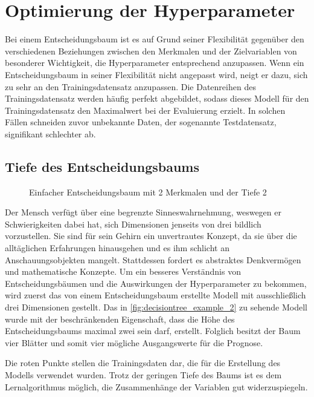 \documentclass[12pt, a4paper]{article}
\begin{document}
\newpage

\section{Optimierung der Hyperparameter}
\label{sec:hyperparameters}

Bei einem Entscheidungsbaum ist es auf Grund seiner Flexibilität gegenüber den verschiedenen Beziehungen zwischen den Merkmalen und der Zielvariablen von besonderer Wichtigkeit, die Hyperparameter entsprechend anzupassen. Wenn ein Entscheidungsbaum in seiner Flexibilität nicht angepasst wird, neigt er dazu, sich zu sehr an den Trainingsdatensatz anzupassen. Die Datenreihen des Trainingsdatensatz werden häufig perfekt abgebildet, sodass dieses Modell für den Trainingsdatensatz den Maximalwert bei der Evaluierung erzielt. In solchen Fällen schneiden zuvor unbekannte Daten, der sogenannte Testdatensatz, signifikant schlechter ab.

\subsection{Tiefe des Entscheidungsbaums}

\begin{figure}[H]
\centering
\def\svgwidth{350pt}

\caption{Einfacher Entscheidungsbaum mit 2 Merkmalen und der Tiefe 2}
\label{fig:decisiontree_example_2}
\end {figure}

Der Mensch verfügt über eine begrenzte Sinneswahrnehmung, weswegen er Schwierigkeiten dabei hat, sich Dimensionen jenseits von drei bildlich vorzustellen. Sie sind für sein Gehirn ein unvertrautes Konzept, da sie über die alltäglichen Erfahrungen hinausgehen und es ihm schlicht an Anschauungsobjekten mangelt. Stattdessen fordert es abstraktes Denkvermögen und mathematische Konzepte. Um ein besseres Verständnis von Entscheidungsbäumen und die Auswirkungen der Hyperparameter zu bekommen, wird zuerst das von einem Entscheidungsbaum erstellte Modell mit ausschließlich drei Dimensionen gestellt. Das in \autoref{fig:decisiontree_example_2} zu sehende Modell wurde mit der beschränkenden Eigenschaft, dass die Höhe des Entscheidungsbaums maximal zwei sein darf, erstellt. Folglich besitzt der Baum vier Blätter und somit vier mögliche Ausgangswerte für die Prognose. 

Die roten Punkte stellen die Trainingsdaten dar, die für die Erstellung des Modells verwendet wurden. Trotz der geringen Tiefe des Baums ist es dem Lernalgorithmus möglich, die Zusammenhänge der Variablen gut widerzuspiegeln.
\end{document}
